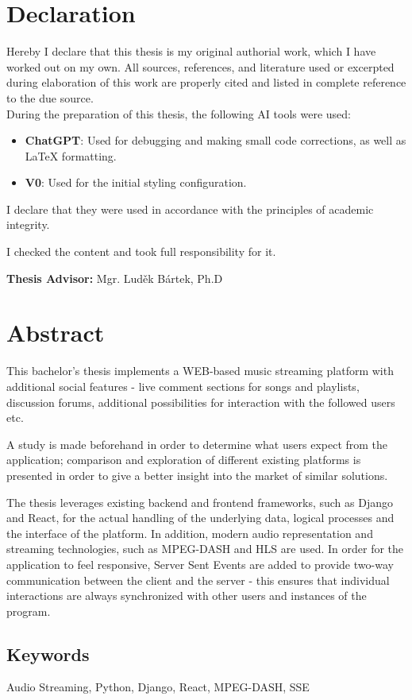 \section*{Declaration}
Hereby I declare that this thesis is my original authorial work, which I have worked out on my own. All
sources, references, and literature used or excerpted during elaboration of this work are properly cited and
listed in complete reference to the due source.
\\
During the preparation of this thesis, the following AI tools were used:

\begin{itemize}
    \item \textbf{ChatGPT}: Used for debugging and making small code corrections, as well as LaTeX formatting.
    \item \textbf{V0}: Used for the initial styling configuration.
\end{itemize}

I declare that they were used in accordance with the principles of academic integrity.

I checked the content and took full responsibility for it.

\vfill\noindent
\textbf{Thesis Advisor:} Mgr. Luděk Bártek, Ph.D
\cleardoublepage

\section*{Abstract}
This bachelor's thesis implements a WEB-based music streaming platform
with additional social features - live comment sections for songs and playlists,
discussion forums, additional possibilities for interaction with the followed users etc.

A study is made beforehand in order to determine what users expect from the application;
comparison and exploration of different existing platforms is presented in order
to give a better insight into the market of similar solutions.

The thesis leverages existing backend and frontend frameworks, such as Django and React, for the
actual handling of the underlying data, logical processes and the interface of the platform.
In addition, modern audio representation and streaming technologies,
such as MPEG-DASH and HLS are used.
In order for the application to feel responsive, Server Sent Events are added to provide
two-way communication between the client and the server - this ensures that
individual interactions are always synchronized with other users and instances of the program.


\subsection*{Keywords}
Audio Streaming, Python, Django, React, MPEG-DASH, SSE
